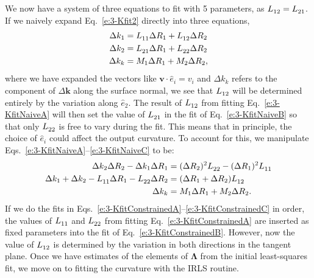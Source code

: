 We now have a system of three equations to fit with 5 parameters, as $\tensor{L}{_{12}} = \tensor{L}{_{21}}$.
If we naively expand Eq.~\ref{e:3-Kfit2} directly into three equations,
\begin{align}
  \Delta k_1 &= \tensor{L}{_{11}} \Delta R_1 + \tensor{L}{_{12}} \Delta R_2\label{e:3-KfitNaiveA} \\
  \Delta k_2 &= \tensor{L}{_{21}} \Delta R_1 + \tensor{L}{_{22}} \Delta R_2\label{e:3-KfitNaiveB} \\
  \Delta k_k &= M_1 \Delta R_1 + M_2 \Delta R_2,\label{e:3-KfitNaiveC}
\end{align}
where we have expanded the vectors like $\mathbf{v}\cdot \hat{e}_i = v_i$ and $\Delta k_k$ refers to the component of $\Delta \mathbf{k}$ along the surface normal, we see that $\tensor{L}{_{12}}$ will be determined entirely by the variation along $\hat{e}_2$.
The result of $\tensor{L}{_{12}}$ from fitting Eq.~\ref{e:3-KfitNaiveA} will then set the value of $\tensor{L}{_{21}}$ in the fit of Eq.~\ref{e:3-KfitNaiveB} so that only $\tensor{L}{_{22}}$ is free to vary during the fit.
This means that in principle, the choice of $\hat{e}_i$ could affect the output curvature.
To account for this, we manipulate Eqs.~\ref{e:3-KfitNaiveA}--\ref{e:3-KfitNaiveC} to be:
\begin{align}
  \Delta k_2 \Delta R_2 - \Delta k_1 \Delta R_1 &= (\Delta R_2)^2 \tensor{L}{_{22}} - (\Delta R_1)^2 \tensor{L}{_{11}}\label{e:3-KfitConstrainedA}\\
  \Delta k_1 + \Delta k_2 - \tensor{L}{_{11}} \Delta R_1 - \tensor{L}{_{22}} \Delta R_2 &= (\Delta R_1 + \Delta R_2)\tensor{L}{_{12}}\label{e:3-KfitConstrainedB}\\
  \Delta k_k &= M_1 \Delta R_1 + M_2 \Delta R_2.\label{e:3-KfitConstrainedC}
\end{align}
If we do the fits in Eqs.~\ref{e:3-KfitConstrainedA}--\ref{e:3-KfitConstrainedC} in order, the values of $\tensor{L}{_{11}}$ and $\tensor{L}{_{22}}$ from fitting Eq.~\ref{e:3-KfitConstrainedA} are inserted as fixed parameters into the fit of Eq.~\ref{e:3-KfitConstrainedB}.
However, now the value of $\tensor{L}{_{12}}$ is determined by the variation in both directions in the tangent plane.
Once we have estimates of the elements of $\bm{\Lambda}$ from the initial least-squares fit, we move on to fitting the curvature with the IRLS routine.

